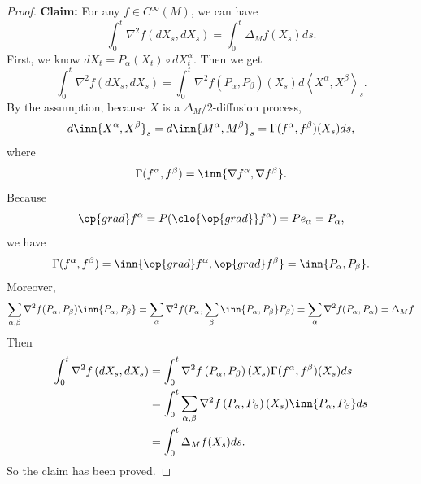 \begin{proof}
    \textbf{Claim:} For any $f \in C^\infty(M)$, we can have
    \begin{equation*}
        \int_0^t \nabla^2f(dX_s,dX_s)= \int_0^t \Delta_Mf(X_s)ds.
    \end{equation*}
    First, we know $dX_t = P_\alpha(X_t) \circ dX^\alpha_t$. Then we get
    \begin{equation*}
        \int_0^t \nabla^2 f\left(d X_s, d X_s\right)=\int_0^t \nabla^2 f\left(P_\alpha, P_\beta\right)(X_s) d\left\langle X^\alpha, X^\beta\right\rangle_s.
    \end{equation*}
    By the assumption, because $X$ is a $\Delta_M / 2$-diffusion process,
    \begin{equation*}
        d\inn{X^\alpha,X^\beta}_s = d\inn{M^\alpha,M^\beta}_s = \Gamma(f^\alpha,f^\beta)(X_s)ds,
    \end{equation*}
    where
    \begin{equation*}
        \Gamma(f^\alpha,f^\beta) = \inn{\nabla f^\alpha,\nabla f^\beta}.
    \end{equation*}
    Because
    \begin{equation*}
        \op{grad} f^\alpha = P(\clo{\op{grad}} f^\alpha) = Pe_\alpha = P_\alpha,
    \end{equation*}
    we have
    \begin{equation*}
        \Gamma(f^\alpha,f^\beta) = \inn{\op{grad} f^\alpha,\op{grad} f^\beta} = \inn{P_\alpha,P_\beta}.
    \end{equation*}
    Moreover,
    \begin{equation*}
        \sum_{\alpha,\beta}\nabla^2f(P_\alpha,P_\beta)\inn{P_\alpha,P_\beta} = \sum_{\alpha}\nabla^2f(P_\alpha,\sum_\beta\inn{P_\alpha,P_\beta} P_\beta) = \sum_\alpha\nabla^2f(P_\alpha,P_\alpha) = \Delta_Mf
    \end{equation*}
    Then
    \begin{align*}
        \int_0^t \nabla^2 f\left(d X_s, d X_s\right) &= \int_0^t \nabla^2 f\left(P_\alpha, P_\beta\right)(X_s)\Gamma(f^\alpha,f^\beta)(X_s)ds \\
        &=\int_0^t  \sum_{\alpha,\beta} \nabla^2f\left(P_\alpha, P_\beta\right)(X_s)\inn{P_\alpha,P_\beta} ds \\
        &=\int_0^t\Delta_Mf(X_s)ds.
    \end{align*}
    So the claim has been proved.


\end{proof}
